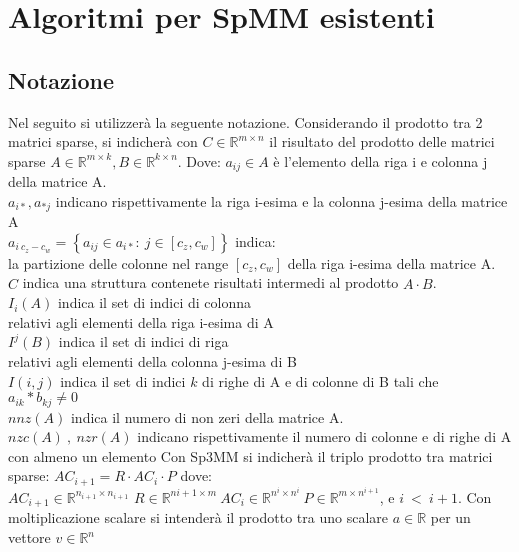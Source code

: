 \chapter{Algoritmi per SpMM esistenti}
\label{ChExistingTecqs}



\section{Notazione}	\label{notazione}
Nel seguito si utilizzerà la seguente notazione.
\voidLine
Considerando il prodotto tra 2 matrici sparse, si indicherà con $C \in \mathbb{R}^{m \times n}$ il risultato del prodotto delle matrici sparse 
$A \in \mathbb{R}^{m \times k},B \in \mathbb{R}^{k \times n}$. Dove:
\voidLine
$a_{ij} \in A$ è l'elemento della riga i e colonna j della matrice A.\\
$a_{i*},a_{*j}$ indicano rispettivamente la riga i-esima e la colonna j-esima della matrice A\\
$a_{i~c_z-c_w} = \left\{ a_{ij} \in a_{i*} :~ j \in [c_z,c_w] \right\}$  
indica:\\ la partizione delle colonne nel range $[c_z,c_w]$ della riga i-esima della matrice A.\\
$\hat{C}$ indica una struttura contenete risultati intermedi al prodotto $A \cdot B$.\\
\voidLine
$I_i(A)$ indica il set di indici di colonna \\relativi agli elementi \nnz della riga i-esima di A\\
$I^j(B)$ indica il set di indici di riga \\relativi agli elementi \nnz della colonna j-esima di B\\
$I(i,j)$ indica il set di indici $k$ di righe di A e di colonne di B tali che
$a_{ik}*b_{kj} \neq 0$\\
$nnz(A)$ indica il numero di non zeri della matrice A. \\ 
$nzc(A)~,~nzr(A)$ indicano rispettivamente il numero di colonne e di righe di A con almeno un elemento \nnz
\voidLine
\label{notazioneNaming}	\label{notazioneSp3MM}
Con Sp3MM si indicherà il triplo prodotto tra matrici sparse: $AC_{i+1}=R \cdot AC_i \cdot P$ dove:\\
$AC_{i+1} \in \mathbb{R}^{n_{i+1} \times n_{i+1} }$  
$R \in \mathbb{R}^{n{i+1} \times m} ~  AC_i \in \mathbb{R}^{n^i \times n^i} ~ P \in \mathbb{R}^{m \times n^{i+1}}$, e $i~<~i+1$.
\voidLine
Con moltiplicazione scalare si intenderà il prodotto tra uno scalare $a \in \mathbb{R}$ per un vettore $v \in \mathbb{R}^n$\\

